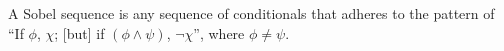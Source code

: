 A Sobel sequence is any sequence of conditionals that adheres to the pattern of \enquote{If $\phi$, $\chi$; [but] if $(\phi\land\psi)$, $\neg\chi$}, where $\phi\neq\psi$.%
